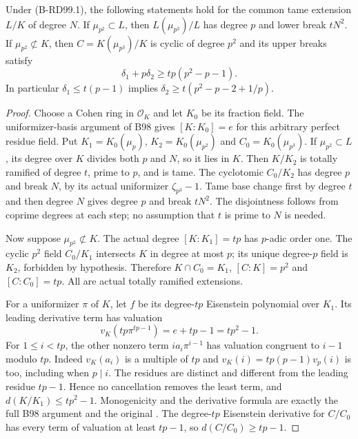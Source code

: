\begin{lemma}
\label{lem:B-RD99-cyclotomic}
Under (B-RD99.1), the following statements hold for the common
tame extension $L/K$ of degree $N$.
If $\mu_{p^2}\subset L$, then $L(\mu_{p^3})/L$ has degree
$p$ and lower break $tN^2$.
If $\mu_{p^2}\not\subset K$, then $C=K(\mu_{p^3})/K$
is cyclic of degree $p^2$ and its upper breaks satisfy
\[
 \delta_1+p\delta_2\ge tp(p^2-p-1).
                                                        \tag{B-RD99.12}
\]
In particular $\delta_1\le t(p-1)$ implies
$\delta_2\ge t(p^2-p-2+1/p)$.
\end{lemma}
\begin{proof}
Choose a Cohen ring in $\mathcal O_K$ and let $K_0$ be its
fraction field. The uniformizer-basis argument of B98 gives
$[K:K_0]=e$ for this arbitrary perfect residue field. Put
$K_1=K_0(\mu_p)$, $K_2=K_0(\mu_{p^2})$ and
$C_0=K_0(\mu_{p^3})$.
If $\mu_{p^2}\subset L$, its degree over $K$ divides both
$p$ and $N$, so it lies in $K$. Then $K/K_2$ is totally
ramified of degree $t$, prime to $p$, and is tame. The
cyclotomic $C_0/K_2$ has degree $p$ and break $N$, by its
actual uniformizer $\zeta_{p^3}-1$. Tame base change first
by degree $t$ and then degree $N$ gives degree $p$ and break
$tN^2$. The disjointness follows from coprime degrees at
each step; no assumption that $t$ is prime to $N$ is needed.

Now suppose $\mu_{p^2}\not\subset K$. The actual degree
$[K:K_1]=tp$ has $p$-adic order one. The cyclic $p^2$ field
$C_0/K_1$ intersects $K$ in degree at most $p$; its unique
degree-$p$ field is $K_2$, forbidden by hypothesis. Therefore
$K\cap C_0=K_1$, $[C:K]=p^2$ and $[C:C_0]=tp$.
All are actual totally ramified extensions.

For a uniformizer $\pi$ of $K$, let $f$ be its degree-$tp$
Eisenstein polynomial over $K_1$. Its leading derivative term
has valuation
\[
        v_K(tp\pi^{tp-1})=e+tp-1=tp^2-1.
                                                        \tag{B-RD99.13}
\]
For $1\le i<tp$, the other nonzero term $i a_i\pi^{i-1}$
has valuation congruent to $i-1$ modulo $tp$. Indeed
$v_K(a_i)$ is a multiple of $tp$ and
$v_K(i)=tp(p-1)v_p(i)$ is too, including when $p\mid i$.
The residues are distinct and different from the leading
residue $tp-1$. Hence no cancellation removes the least term,
and $d(K/K_1)\le tp^2-1$. Monogenicity and the derivative
formula are exactly the full B98 argument and the original
\cite[Proposition3.18 and complete proof, pp.~17--18]
{ColmezCorpsLocaux}. The degree-$tp$ Eisenstein derivative
for $C/C_0$ has every term of valuation at least $tp-1$,
so $d(C/C_0)\ge tp-1$.


\end{proof}
